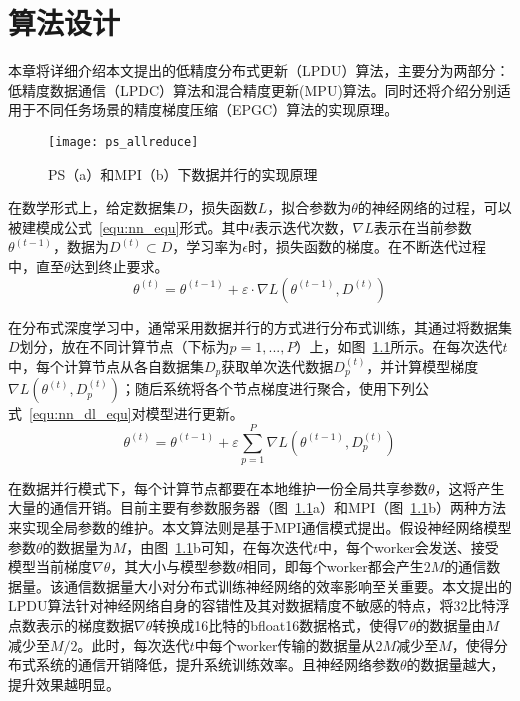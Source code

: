 \chapter{算法设计}

本章将详细介绍本文提出的低精度分布式更新（LPDU）算法，主要分为两部分：低精度数据通信（LPDC）算法和混合精度更新(MPU)算法。同时还将介绍分别适用于不同任务场景的精度梯度压缩（EPGC）算法的实现原理。

\begin{figure}[htp]
\centering
\texttt{[image: ps\_allreduce]}
\caption{PS（a）和MPI（b）下数据并行的实现原理}
\label{fig:ps_allreduce}
\end{figure}

在数学形式上，给定数据集$D$，损失函数$L$，拟合参数为$\theta$的神经网络的过程，可以被建模成公式~\ref{equ:nn_equ}形式。其中$t$表示迭代次数，$\nabla L$表示在当前参数$\theta^{(t-1)}$，数据为$D^{(t)}\subset D$，学习率为$\epsilon$时，损失函数的梯度。在不断迭代过程中，直至$\theta$达到终止要求。
\begin{equation}
\label{equ:nn_equ}
\theta^{(t)}=\theta^{(t-1)}+\varepsilon\cdot\nabla L(\theta^{(t-1)},D^{(t)})
\end{equation}

在分布式深度学习中，通常采用数据并行的方式进行分布式训练，其通过将数据集$D$划分，放在不同计算节点（下标为$p=1,...,P$）上，如图~\ref{fig:ps_allreduce}所示。在每次迭代$t$中，每个计算节点从各自数据集$D_{p}$获取单次迭代数据$D^{(t)}_{p}$，并计算模型梯度$\nabla L(\theta^{(t)},D^{(t)}_{p})$；随后系统将各个节点梯度进行聚合，使用下列公式~\ref{equ:nn_dl_equ}对模型进行更新。
\begin{equation}
\label{equ:nn_dl_equ}
\theta^{(t)}=\theta^{(t-1)}+\varepsilon\sum^{P}_{p=1}\nabla L(\theta^{(t-1)},D^{(t)}_{p})
\end{equation}

在数据并行模式下，每个计算节点都要在本地维护一份全局共享参数$\theta$，这将产生大量的通信开销。目前主要有参数服务器（图~\ref{fig:ps_allreduce}a）和MPI（图~\ref{fig:ps_allreduce}b）两种方法来实现全局参数的维护。本文算法则是基于MPI通信模式提出。假设神经网络模型参数$\theta$的数据量为$M$，由图~\ref{fig:ps_allreduce}b可知，在每次迭代$t$中，每个worker会发送、接受模型当前梯度$\nabla\theta$，其大小与模型参数$\theta$相同，即每个worker都会产生$2M$的通信数据量。该通信数据量大小对分布式训练神经网络的效率影响至关重要。本文提出的LPDU算法针对神经网络自身的容错性及其对数据精度不敏感的特点，将32比特浮点数表示的梯度数据$\nabla\theta$转换成16比特的bfloat16数据格式，使得$\nabla\theta$的数据量由$M$减少至$M/2$。此时，每次迭代$t$中每个worker传输的数据量从$2M$减少至$M$，使得分布式系统的通信开销降低，提升系统训练效率。且神经网络参数$\theta$的数据量越大，提升效果越明显。


